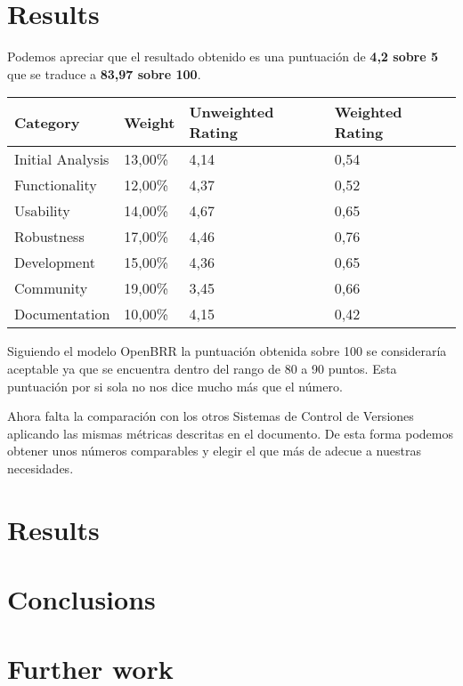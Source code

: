 \documentclass[11pt]{scrartcl}
\begin{document}
\section{Results}

Podemos apreciar que el resultado obtenido es una puntuaci\'on de \textbf{4,2 sobre 5} que se traduce a \textbf{83,97 sobre 100}.

\begin{tabular}{|l|l|l|l|}
    \hline {\bf Category} & {\bf Weight} & {\bf Unweighted Rating} & {\bf Weighted Rating}\\
    \hline Initial Analysis	 & 13,00\% & 4,14 & 0,54 \\
    \hline Functionality & 12,00\% & 4,37 & 0,52\\
    \hline Usability & 14,00\% & 4,67 & 0,65\\
    \hline Robustness & 17,00\% & 4,46 & 0,76\\
    \hline Development & 15,00\% & 4,36 & 0,65\\
    \hline Community & 19,00\% & 3,45 & 0,66\\
    \hline Documentation & 10,00\% & 4,15 & 0,42\\
    \hline
\end{tabular}

\par Siguiendo el modelo OpenBRR la puntuaci\'on obtenida sobre 100 se considerar\'ia aceptable ya que se encuentra dentro del rango de 80 a 90 puntos. Esta puntuaci\'on por si sola no nos dice mucho m\'as que el n\'umero.

\par Ahora falta la comparaci\'on con los otros Sistemas de Control de Versiones aplicando las mismas m\'etricas descritas en el documento. De esta forma podemos obtener unos n\'umeros comparables y elegir el que m\'as de adecue a nuestras necesidades.

\section{Results}


\section{Conclusions}

\section{Further work}
\end{document}
